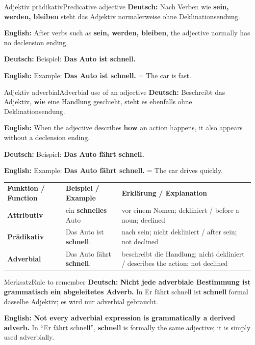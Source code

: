 \documentclass[a4paper,11pt]{article}
\newcommand{\GermanText}[1]{\textbf{Deutsch: }#1\par}
\newcommand{\EnglishText}[1]{{\small\color{SoftGray}\textbf{English: }#1\par}}
\begin{document}
\begin{grammarentry}{Adjektiv prädikativ}{Predicative adjective}
\GermanText{Nach Verben wie \textbf{sein, werden, bleiben} steht das Adjektiv normalerweise ohne Deklinationsendung.}
\EnglishText{After verbs such as \textbf{sein, werden, bleiben}, the adjective normally has no declension ending.}
\GermanText{Beispiel: \textbf{Das Auto ist schnell.}}
\EnglishText{Example: \textbf{Das Auto ist schnell.} = The car is fast.}
\end{grammarentry}

\begin{grammarentry}{Adjektiv adverbial}{Adverbial use of an adjective}
\GermanText{Beschreibt das Adjektiv, \textbf{wie} eine Handlung geschieht, steht es ebenfalls ohne Deklinationsendung.}
\EnglishText{When the adjective describes \textbf{how} an action happens, it also appears without a declension ending.}
\GermanText{Beispiel: \textbf{Das Auto fährt schnell.}}
\EnglishText{Example: \textbf{Das Auto fährt schnell.} = The car drives quickly.}
\end{grammarentry}

\begin{longtable}{>{\bfseries}p{3.2cm}|p{4.8cm}|p{6.0cm}}
\rowcolor{HeaderBlueDark}
\color{white}\textbf{Funktion / Function} & \color{white}\textbf{Beispiel / Example} & \color{white}\textbf{Erklärung / Explanation} \\
Attributiv & ein \textbf{schnelles} Auto & vor einem Nomen; dekliniert / before a noun; declined \\
Prädikativ & Das Auto ist \textbf{schnell}. & nach sein; nicht dekliniert / after sein; not declined \\
Adverbial & Das Auto fährt \textbf{schnell}. & beschreibt die Handlung; nicht dekliniert / describes the action; not declined \\
\end{longtable}

\begin{grammarentry}{Merksatz}{Rule to remember}
\GermanText{\textbf{Nicht jede adverbiale Bestimmung ist grammatisch ein abgeleitetes Adverb.} In \glqq Er fährt schnell\grqq{} ist \textbf{schnell} formal dasselbe Adjektiv; es wird nur adverbial gebraucht.}
\EnglishText{\textbf{Not every adverbial expression is grammatically a derived adverb.} In ``Er fährt schnell'', \textbf{schnell} is formally the same adjective; it is simply used adverbially.}
\end{grammarentry}
\end{document}
